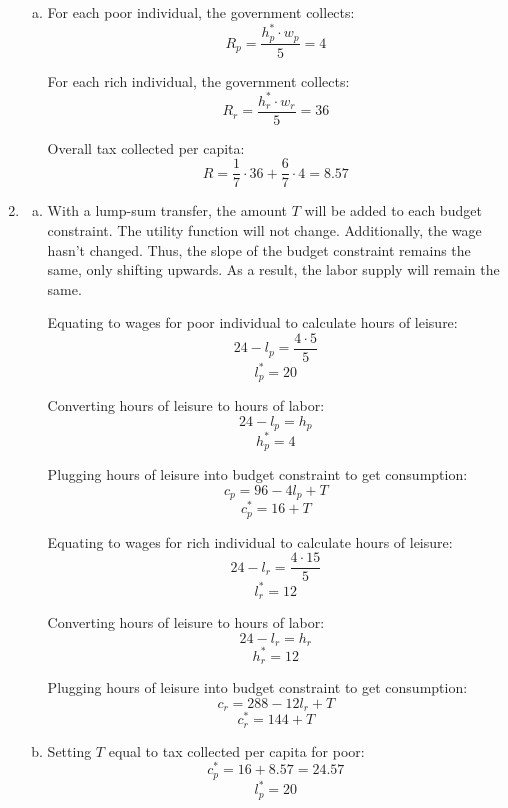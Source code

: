 \documentclass{article}
\begin{document}
\begin{enumerate}[1.]
\begin{enumerate}[a.]
            \item For each poor individual, the government collects:
                $$ R_{p} = \frac{ h_{p}^{*} \cdot w_{p} }{ 5 } = 4 $$

                For each rich individual, the government collects:
                $$ R_{r} = \frac{ h_{r}^{*} \cdot w_{r} }{ 5 } = 36 $$

                Overall tax collected per capita:
                $$ R =  \frac{ 1 }{ 7 } \cdot 36 + \frac{ 6 }{ 7 } \cdot 4 =
                8.57$$

        \end{enumerate}
        
    \item 
        \begin{enumerate}[a.]
            \item With a lump-sum transfer, the amount $T$ will be added to each
                budget constraint. The utility function will not change.
                Additionally, the wage hasn't changed. Thus, the slope of the
                budget constraint remains the same, only shifting upwards. As a
                result, the labor supply will remain the same.

                Equating to wages for poor individual to calculate hours of
                leisure:
                $$ 24 - l_{p} = \frac{ 4 \cdot 5 }{ 5 } $$
                $$ l_{p}^{*} = 20 $$

                Converting hours of leisure to hours of labor:
                $$ 24 - l_{p} = h_{p} $$
                $$ h_{p}^{*} = 4 $$

                Plugging hours of leisure into budget constraint to get
                consumption:
                $$ c_{p} = 96 - 4l_{p} + T $$
                $$ c_{p}^{*} =  16 + T$$

                Equating to wages for rich individual to calculate hours of
                leisure:
                $$ 24 - l_{r} = \frac{ 4 \cdot 15 }{ 5 } $$
                $$ l_{r}^{*} = 12 $$

                Converting hours of leisure to hours of labor:
                $$ 24 - l_{r} = h_{r} $$
                $$ h_{r}^{*} = 12 $$

                Plugging hours of leisure into budget constraint to get
                consumption:
                $$ c_{r} = 288 - 12 l_{r} + T $$
                $$ c_{r}^{*} = 144 + T$$

            \item Setting $T$ equal to tax collected per capita for poor:
                $$ c_{p}^{*} = 16 + 8.57 = 24.57 $$
                $$ l_{p}^{*} = 20 $$


\end{enumerate}
\end{enumerate}
\end{document}
